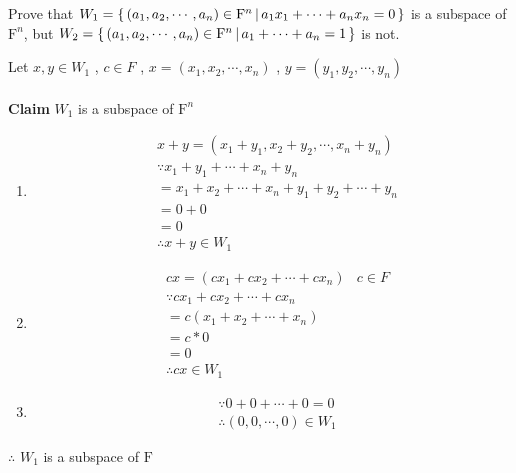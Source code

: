 Prove that $W_1 = \left\{ \,\left(a_1,a_2,\cdots,a_n\right) \in \mathrm{F}^n \,|\, a_1x_1+\cdots+a_nx_n = 0 \,\right\}$ is a subspace of $\mathrm{F}^n$, but $W_2 = \left\{ \, \left( a_1,a_2,\cdots ,a_n \right) \in \mathrm{F}^n \, | \, a_1+\cdots+a_n = 1 \,\right\}$ is not.

\begin{tcolorbox}
\begin{solution}
	Let $x,y \in W_1$ , $c \in F$ , $x = (x_1,x_2,\cdots,x_n)$ , $y=(y_1,y_2,\cdots,y_n)$\\ \\
	
	\textbf{Claim} $W_1$ is a subspace of $\mathrm{F}^n$
	
	\begin{enumerate}
		\item \begin{align*}
		&x+y  =  (x_1+y_1,x_2+y_2,\cdots,x_n+y_n)  \\
		&\because x_1 + y_1 + \cdots + x_n + y_n\\			
		&= x_1 +x_2 + \cdots +x_n + y_1 + y_2 + \cdots + y_n\\
		&=0+0\\
		&=0\\
		&\therefore x+y \in W_1
		\end{align*}
		\item \begin{align*}
			&cx = (cx_1+cx_2+\cdots + cx_n)  &c \in F\\
			&\because cx_1+cx_2+\cdots+cx_n\\
			&=c(x_1+x_2+\cdots+x_n)\\
			&=c*0\\
			&=0\\
			&\therefore cx \in W_1 
		\end{align*}
		\item \begin{align*}
			&\because 0+0+\cdots+0=0   \\
			&\therefore (0,0,\cdots,0) \in W_1 
		\end{align*}
	\end{enumerate}
	
	$\therefore$ $W_1$ is a subspace of $\mathrm{F}$
\end{solution}

\end{tcolorbox}